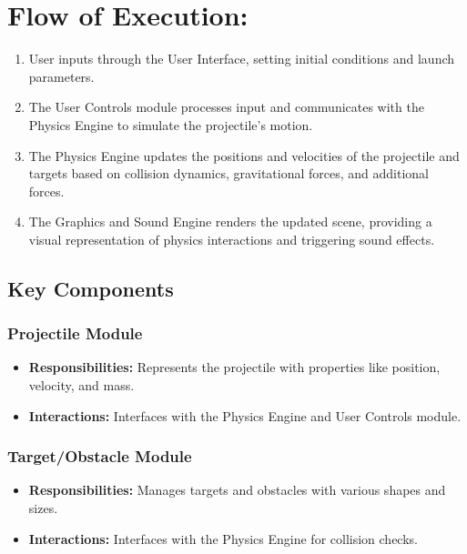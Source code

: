 \documentclass[12pt, titlepage]{article}
\begin{document}
\section{Flow of Execution:}
\begin{enumerate}
  \item User inputs through the User Interface, setting initial conditions and launch parameters.

  \item The User Controls module processes input and communicates with the Physics Engine to simulate the projectile's motion.

  \item The Physics Engine updates the positions and velocities of the projectile and targets based on collision dynamics, gravitational forces, and additional forces.

  \item The Graphics and Sound Engine renders the updated scene, providing a visual representation of physics interactions and triggering sound effects.

\end{enumerate}

\subsection{Key Components}
\subsubsection{Projectile Module}
\begin{itemize}
  \item \textbf{Responsibilities:} Represents the projectile with properties like position, velocity, and mass.
  \item \textbf{Interactions:} Interfaces with the Physics Engine and User Controls module.
\end{itemize}

\subsubsection{Target/Obstacle Module}
\begin{itemize}
  \item \textbf{Responsibilities:} Manages targets and obstacles with various shapes and sizes.
  \item \textbf{Interactions:} Interfaces with the Physics Engine for collision checks.
\end{itemize}
\end{document}
